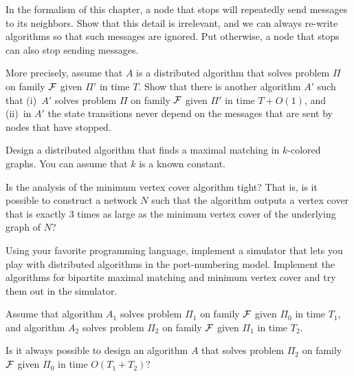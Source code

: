 \begin{ex}\label{ex:stopped}
    In the formalism of this chapter, a node that stops will repeatedly send messages to its neighbors. Show that this detail is irrelevant, and we can always re-write algorithms so that such messages are ignored. Put otherwise, a node that stops can also stop sending messages.
    
    More precisely, assume that $A$ is a distributed algorithm that solves problem $\Pi$ on family $\mathcal{F}$ given $\Pi'$ in time $T$. Show that there is another algorithm $A'$ such that (i)~$A'$ solves problem $\Pi$ on family $\mathcal{F}$ given $\Pi'$ in time $T + O(1)$, and (ii)~in $A'$ the state transitions never depend on the messages that are sent by nodes that have stopped.
\end{ex}

\begin{ex}
    Design a distributed algorithm that finds a maximal matching in $k$-colored graphs. You can assume that $k$ is a known constant.
\end{ex}

\begin{ex}\label{ex:vc3tight}
    Is the analysis of the minimum vertex cover  algorithm tight? That is, is it possible to construct a network $N$ such that the algorithm outputs a vertex cover that is exactly $3$ times as large as the minimum vertex cover of the underlying graph of $N$?
\end{ex}

\begin{exs}[implementation]\label{ex:simulator}
    Using your favorite programming language, implement a simulator that lets you play with distributed algorithms in the port-numbering model. Implement the algorithms for bipartite maximal matching and minimum vertex cover  and try them out in the simulator.
\end{exs}

\begin{exs}[composition]\label{ex:composition}
    Assume that algorithm $A_1$ solves problem $\Pi_1$ on family $\mathcal{F}$ given $\Pi_0$ in time $T_1$, and algorithm $A_2$ solves problem $\Pi_2$ on family $\mathcal{F}$ given $\Pi_1$ in time $T_2$.
    
    Is it always possible to design an algorithm $A$ that solves problem $\Pi_2$ on family $\mathcal{F}$ given $\Pi_0$ in time $O(T_1 + T_2)$?
    
\end{exs}


